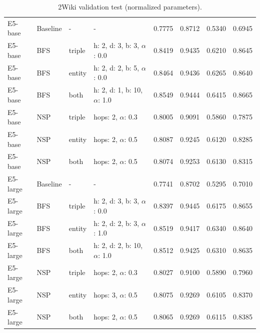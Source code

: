 \documentclass[11pt]{article}
\begin{document}
\begin{table}[t]
\begin{tabular}{llllcccc}
E5-base & Baseline & - & - & 0.7775 & 0.8712 & 0.5340 & 0.6945 \\
E5-base & BFS & triple & h: 2, d: 3, b: 3, $\alpha$: 0.0 & 0.8419 & 0.9435 & 0.6210 & 0.8645 \\
E5-base & BFS & entity & h: 2, d: 2, b: 5, $\alpha$: 0.0 & 0.8464 & 0.9436 & 0.6265 & 0.8640 \\
E5-base & BFS & both & h: 2, d: 1, b: 10, $\alpha$: 1.0 & 0.8549 & 0.9444 & 0.6415 & 0.8665 \\
E5-base & NSP & triple & hops: 2, $\alpha$: 0.3 & 0.8005 & 0.9091 & 0.5860 & 0.7875 \\
E5-base & NSP & entity & hops: 2, $\alpha$: 0.5 & 0.8087 & 0.9245 & 0.6120 & 0.8285 \\
E5-base & NSP & both & hops: 2, $\alpha$: 0.5 & 0.8074 & 0.9253 & 0.6130 & 0.8315 \\

E5-large & Baseline & - & - & 0.7741 & 0.8702 & 0.5295 & 0.7010 \\
E5-large & BFS & triple & h: 2, d: 3, b: 3, $\alpha$: 0.0 & 0.8397 & 0.9445 & 0.6175 & 0.8655 \\
E5-large & BFS & entity & h: 2, d: 2, b: 3, $\alpha$: 1.0 & 0.8519 & 0.9417 & 0.6340 & 0.8640 \\
E5-large & BFS & both & h: 2, d: 2, b: 10, $\alpha$: 1.0 & 0.8512 & 0.9425 & 0.6310 & 0.8635 \\
E5-large & NSP & triple & hops: 2, $\alpha$: 0.3 & 0.8027 & 0.9100 & 0.5890 & 0.7960 \\
E5-large & NSP & entity & hops: 3, $\alpha$: 0.5 & 0.8075 & 0.9269 & 0.6105 & 0.8370 \\
E5-large & NSP & both & hops: 2, $\alpha$: 0.5 & 0.8065 & 0.9269 & 0.6115 & 0.8385 \\

\bottomrule
\end{tabular}
\caption{2Wiki validation test (normalized parameters).}
\label{tab:2wiki}
\end{table}
\end{document}
